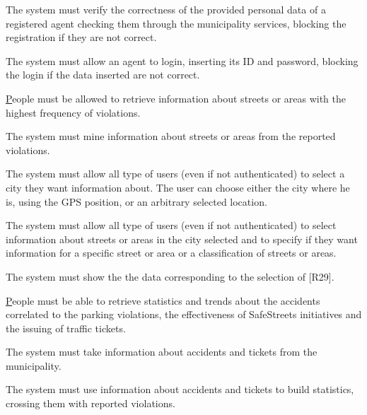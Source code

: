 \documentclass[a4paper]{report}
\begin{document}
\begin{enumerate}[start=1,label={[G\arabic*]}]
\begin{enumerate}[start=13,label={[R\arabic*]}]
\end{enumerate}
\begin{enumerate}[start=25,label={[R\arabic*b]}]
\item \label{R25b}The system must verify the correctness of the provided personal data of a registered agent checking them through the municipality services, blocking the registration if they are not correct.
\end{enumerate}
\begin{enumerate}[start=26,label={[R\arabic*]}]
\item \label{R26}The system must allow an agent to login, inserting its ID and password, blocking the login if the data inserted are not correct.
\end{enumerate}
\item  \hyperref[G3] People must be allowed to retrieve information about streets or areas with the highest frequency of violations.
\begin{enumerate}[start=27,label={[R\arabic*]}]
\item \label{R27}The system must mine information about streets or areas from the reported violations.
\item \label{R28}The system must allow all type of users (even if not authenticated) to select a city they want information about. The user can choose either the city where he is, using the GPS position, or an arbitrary selected location.
\item \label{R29}The system must allow all type of users (even if not authenticated) to select information about streets or areas in the city selected and to specify if they want information for a specific street or area or a classification of streets or areas.
\item \label{R30}The system must show the the data corresponding to the selection of [R29].
\end{enumerate}
\item  \hyperref[G4] People must be able to retrieve statistics and trends about the accidents correlated to the parking violations, the effectiveness of SafeStreets initiatives and the issuing of traffic tickets.
\begin{enumerate}[start=31,label={[R\arabic*]}]
\item \label{R31}The system must take information about accidents and tickets from the municipality.
\item \label{R32}The system must use information about accidents and tickets to build statistics, crossing them with reported violations.

\end{enumerate}
\end{enumerate}
\end{document}
